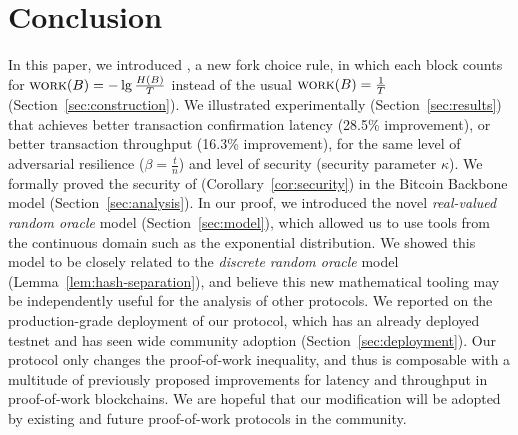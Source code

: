 \section{Conclusion}

In this paper, we introduced \poem, a new fork choice rule, in which each block
counts for $\textsc{work}(B) = -\lg \frac{H(B)}{T}$ instead of the usual $\textsc{work}(B) = \frac{1}{T}$
(Section~\ref{sec:construction}).
We illustrated experimentally (Section~\ref{sec:results}) that \poem achieves better transaction confirmation latency (28.5\% improvement),
or better transaction throughput (16.3\% improvement), for the same level of adversarial resilience ($\beta = \frac{t}{n}$) and level
of security (security parameter $\kappa$). We formally proved the security of \poem (Corollary~\ref{cor:security}) in the Bitcoin Backbone model
(Section~\ref{sec:analysis}).
In our proof, we introduced the novel \emph{real-valued random oracle} model (Section~\ref{sec:model}), which allowed us
to use tools from the continuous domain such as the exponential distribution. We showed this
model to be closely related to the \emph{discrete random oracle} model (Lemma~\ref{lem:hash-separation}),
and believe this new mathematical tooling may be independently useful for the analysis of other protocols.
We reported on the production-grade deployment of our protocol, which has an already deployed testnet
and has seen wide community adoption (Section~\ref{sec:deployment}).
Our protocol only changes the proof-of-work inequality, and thus is composable with a multitude
of previously proposed improvements for latency and throughput in proof-of-work blockchains. We are hopeful
that our modification will be adopted by existing and future proof-of-work protocols in the community.